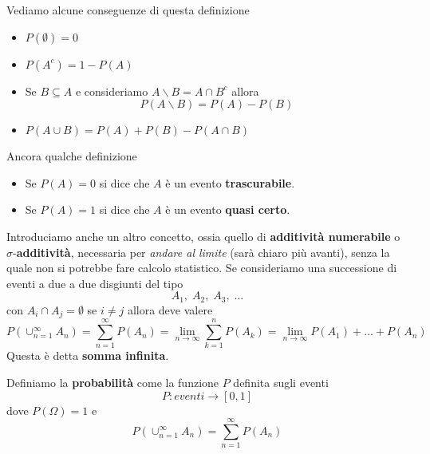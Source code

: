 Vediamo alcune conseguenze di questa definizione
\begin{itemize}
	\item $P(\emptyset) = 0$
	\item $P(A^c) = 1 - P(A)$
	\item Se $B \subseteq A$ e consideriamo $A \backslash B = A \cap B^c$ allora
	      \[ P(A \backslash B) = P(A) - P(B) \]
	\item $P(A \cup B) = P(A) + P(B) - P(A \cap B)$
\end{itemize}
Ancora qualche definizione
\begin{itemize}
	\item Se $P(A) = 0$ si dice che $A$ è un evento \textbf{trascurabile}.
	\item Se $P(A) = 1$ si dice che $A$ è un evento \textbf{quasi certo}.
\end{itemize}
Introduciamo anche un altro concetto, ossia quello di \textbf{additività numerabile} o
$\sigma$-\textbf{additività}, necessaria per \emph{andare al limite} (sarà chiaro più avanti), senza la
quale non si potrebbe fare calcolo statistico. Se consideriamo una successione di eventi a due a due
disgiunti del tipo
\[ A_1, \; A_2, \; A_3, \; \dots \]
con $A_i \cap A_j = \emptyset$ se $i \neq j$ allora deve valere
\[
	P(\cup_{n=1}^\infty A_n) = \sum_{n=1}^\infty P(A_n) =
	\lim_{n \to \infty} \sum_{k=1}^n P(A_k) = 	\lim_{n \to \infty} P(A_1) + \dots + P(A_n)
\]
Questa è detta \textbf{somma infinita}.

\begin{definition}
	Definiamo la \textbf{probabilità} come la funzione $P$ definita sugli eventi
	\[ P : eventi \to [0, 1] \]
	dove $P(\Omega) = 1$ e
	\[ P(\cup_{n=1}^\infty A_n) = \sum_{n=1}^\infty P(A_n) \]
\end{definition}


